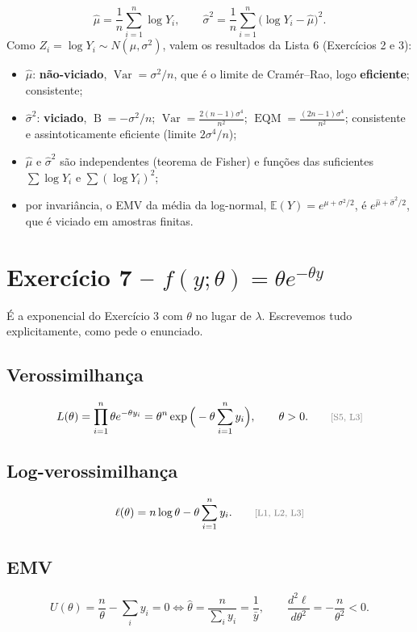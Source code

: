 \documentclass[11pt,a4paper]{article}
\newcommand{\E}{\mathbb{E}}
\newcommand{\Var}{\operatorname{Var}}
\newcommand{\EQM}{\operatorname{EQM}}
\newcommand{\B}{\operatorname{B}}
\newcommand{\just}[1]{\tag*{\footnotesize\textcolor{gray}{[#1]}}}
\theoremstyle{definition}
\theoremstyle{plain}
\begin{document}
\begin{resposta}
\[
\hat\mu=\frac1n\sum_{i=1}^n\log Y_i,\qquad\hat\sigma^2=\frac1n\sum_{i=1}^n\big(\log Y_i-\hat\mu\big)^2 .
\]
Como $Z_i=\log Y_i\sim N(\mu,\sigma^2)$, valem os resultados da Lista 6 (Exercícios 2 e 3):
\begin{itemize}[leftmargin=1.2em]
\item $\hat\mu$: \textbf{não-viciado}, $\Var=\sigma^2/n$, que é o limite de Cramér--Rao, logo \textbf{eficiente}; consistente;
\item $\hat\sigma^2$: \textbf{viciado}, $\B=-\sigma^2/n$; $\Var=\frac{2(n-1)\sigma^4}{n^2}$; $\EQM=\frac{(2n-1)\sigma^4}{n^2}$; consistente e assintoticamente eficiente (limite $2\sigma^4/n$);
\item $\hat\mu$ e $\hat\sigma^2$ são independentes (teorema de Fisher) e funções das suficientes $\sum\log Y_i$ e $\sum(\log Y_i)^2$;
\item por invariância, o EMV da média da log-normal, $\E(Y)=e^{\mu+\sigma^2/2}$, é $e^{\hat\mu+\hat\sigma^2/2}$, que é viciado em amostras finitas.
\end{itemize}
\end{resposta}

\section{Exercício 7 -- $f(y;\theta)=\theta e^{-\theta y}$}

É a exponencial do Exercício 3 com $\theta$ no lugar de $\lambda$. Escrevemos tudo explicitamente, como pede o enunciado.

\subsection*{Verossimilhança}
\[
L(\theta)=\prod_{i=1}^n\theta e^{-\theta y_i}=\theta^n\exp\Big(-\theta\sum_{i=1}^ny_i\Big),\qquad\theta>0 . \just{S5, L3}
\]
\subsection*{Log-verossimilhança}
\[
\ell(\theta)=n\log\theta-\theta\sum_{i=1}^ny_i . \just{L1, L2, L3}
\]
\subsection*{EMV}
\[
U(\theta)=\frac n\theta-\sum_iy_i=0\iff\hat\theta=\frac{n}{\sum_iy_i}=\frac{1}{\bar y},
\qquad
\frac{d^2\ell}{d\theta^2}=-\frac{n}{\theta^2}<0 .
\]
\end{document}
